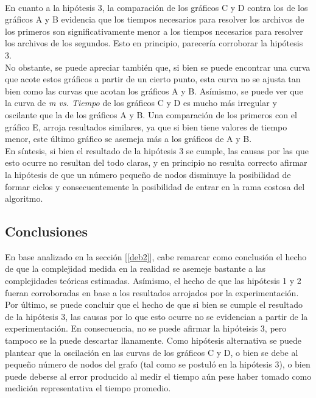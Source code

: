 \paragraph{}
En cuanto a la hipótesis 3, la comparación de los gráficos C y D contra los de los gráficos A y B evidencia que los tiempos necesarios para resolver los archivos de los primeros son significativamente menor a los tiempos necesarios para resolver los archivos de los segundos. Esto en principio, parecería corroborar la hipótesis 3.\\
No obstante, se puede apreciar también que, si bien se puede encontrar una curva que acote estos gráficos a partir de un cierto punto, esta curva no se ajusta tan bien como las curvas que acotan los gráficos A y B. Asímismo, se puede ver que la curva de \textit{m vs. Tiempo} de los gráficos C y D es mucho más irregular y oscilante que la de los gráficos A y B. Una comparación de los primeros con el gráfico E, arroja resultados similares, ya que si bien tiene valores de tiempo menor, este último gráfico se asemeja más a los gráficos de A y B.\\
En síntesis, si bien el resultado de la hipótesis 3 se cumple, las causas por las que esto ocurre no resultan del todo claras, y en principio no resulta correcto afirmar la hipótesis de que un número pequeño de nodos disminuye la posibilidad de formar ciclos y consecuentemente la posibilidad de entrar en la rama costosa del algoritmo.


\subsection{Conclusiones}
\label{conc2}
En base analizado en la sección [\ref{deb2}], cabe remarcar como conclusión el hecho de que la complejidad medida en la realidad se asemeje bastante a las complejidades teóricas estimadas. Asímismo, el hecho de que las hipótesis 1 y 2 fueran corroboradas en base a los resultados arrojados por la experimentación. \\ 
Por último, se puede concluir que el hecho de que si bien se cumple el resultado de la hipótesis 3, las causas por lo que esto ocurre no se evidencian a partir de la experimentación. En consecuencia, no se puede afirmar la hipóteisis 3, pero tampoco se la puede descartar llanamente. Como hipótesis alternativa se puede plantear que la oscilación en las curvas de los gráficos  C y D, o bien se debe al pequeño número de nodos del grafo (tal como se postuló en la hipótesis 3), o bien puede deberse al error producido al medir el tiempo aún pese haber tomado como medición representativa el tiempo promedio.


